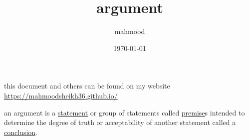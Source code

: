 \documentclass[a4paper,12pt]{article}
\author{mahmood}
\date{\today}
\title{argument}
\begin{document}
\maketitle
\begin{note}
this document and others can be found on my website\\
\url{https://mahmoodsheikh36.github.io/}
\end{note}
\begin{definition}
an argument is a \href{20230401175139-statement.org}{statement} or group of statements called \href{20230524212241-premise.org}{premise}s intended to determine the degree of truth or acceptability of another statement called a \href{20230524212250-conclusion.org}{conclusion}.\\
\end{definition}
\end{document}

